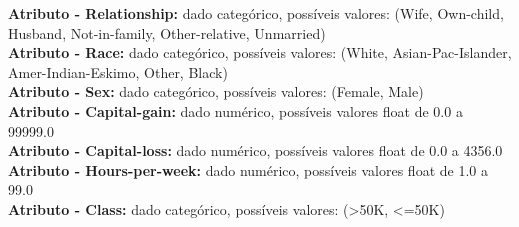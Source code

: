 \documentclass[12pt,a4paper]{article}
\begin{document}
\textbf{Atributo - Relationship:} dado categórico, possíveis valores: (Wife, Own-child, Husband, Not-in-family, Other-relative, Unmarried)\\ 
\textbf{Atributo - Race:} dado categórico, possíveis valores: (White, Asian-Pac-Islander, Amer-Indian-Eskimo, Other, Black)\\ 
\textbf{Atributo - Sex:} dado categórico, possíveis valores: (Female, Male)\\ 
\textbf{Atributo - Capital-gain:} dado numérico, possíveis valores float de 0.0 a 99999.0\\ 
\textbf{Atributo - Capital-loss:} dado numérico, possíveis valores float de 0.0 a 4356.0\\ 
\textbf{Atributo - Hours-per-week:} dado numérico, possíveis valores float de 1.0 a 99.0\\ 
\textbf{Atributo - Class:} dado categórico, possíveis valores: (>50K, <=50K)\\ 
\end{document}
